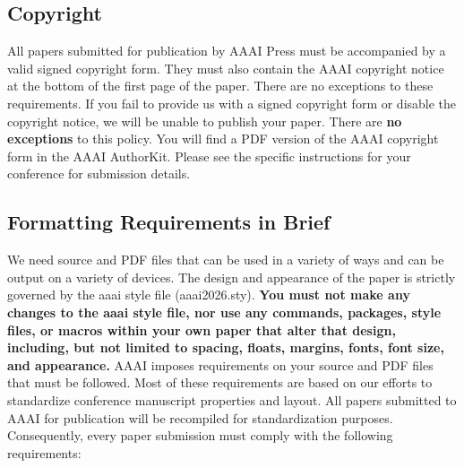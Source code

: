 \documentclass[letterpaper]{article} %
\begin{document}
\subsection{Copyright}\label{copyright}

All papers submitted for publication by AAAI Press must be accompanied
by a valid signed copyright form. They must also contain the AAAI
copyright notice at the bottom of the first page of the paper. There are
no exceptions to these requirements. If you fail to provide us with a
signed copyright form or disable the copyright notice, we will be unable
to publish your paper. There are \textbf{no exceptions} to this policy.
You will find a PDF version of the AAAI copyright form in the AAAI
AuthorKit. Please see the specific instructions for your conference for
submission details.

\subsection{Formatting Requirements in
Brief}\label{formatting-requirements-in-brief}

We need source and PDF files that can be used in a variety of ways and
can be output on a variety of devices. The design and appearance of the
paper is strictly governed by the aaai style file (aaai2026.sty).
\textbf{You must not make any changes to the aaai style file, nor use
any commands, packages, style files, or macros within your own paper
that alter that design, including, but not limited to spacing, floats,
margins, fonts, font size, and appearance.} AAAI imposes requirements on
your source and PDF files that must be followed. Most of these
requirements are based on our efforts to standardize conference
manuscript properties and layout. All papers submitted to AAAI for
publication will be recompiled for standardization purposes.
Consequently, every paper submission must comply with the following
requirements:
\end{document}
